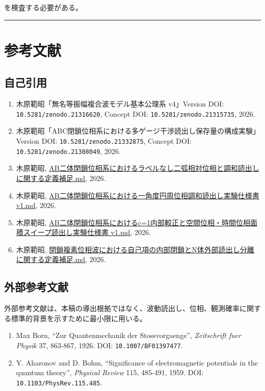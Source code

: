 \documentclass[
]{article}
\providecommand{\tightlist}{%
  \setlength{\itemsep}{0pt}\setlength{\parskip}{0pt}}
\begin{document}
を検査する必要がある。

\begin{center}\rule{0.5\linewidth}{0.5pt}\end{center}

\section{参考文献}\label{ux53c2ux8003ux6587ux732e}

\subsection{自己引用}\label{ux81eaux5df1ux5f15ux7528}

\begin{enumerate}
\def\labelenumi{\arabic{enumi}.}
\tightlist
\item
  木原範昭「無名等振幅複合波モデル基本公理系 v4」Version DOI:
  \texttt{10.5281/zenodo.21316620}, Concept DOI:
  \texttt{10.5281/zenodo.21315735}, 2026.
\item
  木原範昭「ABC閉鎖位相系における多ゲージ干渉読出し保存量の構成実験」Version
  DOI: \texttt{10.5281/zenodo.21332875}, Concept DOI:
  \texttt{10.5281/zenodo.21308049}, 2026.
\item
  木原範昭,
  \href{AB二体閉鎖位相系におけるラベルなし二弧相対位相と調和読出しに関する定義補足.md}{AB二体閉鎖位相系におけるラベルなし二弧相対位相と調和読出しに関する定義補足.md},
  2026.
\item
  木原範昭,
  \href{AB二体閉鎖位相系における一角度円周位相調和読出し実験仕様書\%20v1.md}{AB二体閉鎖位相系における一角度円周位相調和読出し実験仕様書
  v1.md}, 2026.
\item
  木原範昭,
  \href{AB二体閉鎖位相系におけるc=1内部較正と空間位相・時間位相面積スイープ読出し実験仕様書\%20v1.md}{AB二体閉鎖位相系におけるc=1内部較正と空間位相・時間位相面積スイープ読出し実験仕様書
  v1.md}, 2026.
\item
  木原範昭,
  \href{閉鎖複素位相波における自己項の内部閉鎖とN体外部読出し分離に関する定義補足.md}{閉鎖複素位相波における自己項の内部閉鎖とN体外部読出し分離に関する定義補足.md},
  2026.
\end{enumerate}

\subsection{外部参考文献}\label{ux5916ux90e8ux53c2ux8003ux6587ux732e}

外部参考文献は、本稿の導出根拠ではなく、波動読出し、位相、観測確率に関する標準的背景を示すために最小限に用いる。

\begin{enumerate}
\def\labelenumi{\arabic{enumi}.}
\setcounter{enumi}{6}
\tightlist
\item
  Max Born, ``Zur Quantenmechanik der Stossvorgaenge'',
  \emph{Zeitschrift fuer Physik} 37, 863-867, 1926. DOI:
  \texttt{10.1007/BF01397477}.
\item
  Y. Aharonov and D. Bohm, ``Significance of electromagnetic potentials
  in the quantum theory'', \emph{Physical Review} 115, 485-491, 1959.
  DOI: \texttt{10.1103/PhysRev.115.485}.
\end{enumerate}
\end{document}
